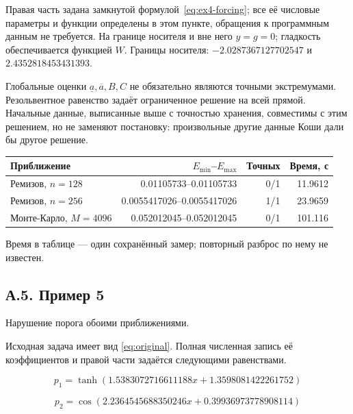 Правая часть задана замкнутой формулой~\eqref{eq:ex4-forcing}; все её числовые параметры и функции определены в этом пункте, обращения к программным данным не требуется. На границе носителя и вне него $y=g=0$; гладкость обеспечивается функцией $W$. Границы носителя: $-2.0287367127702547$ и $2.4352818453431393$.

Глобальные оценки $\underline a,\overline a,B,C$ не обязательно являются точными экстремумами. Резольвентное равенство задаёт ограниченное решение на всей прямой. Начальные данные, выписанные выше с точностью хранения, совместимы с этим решением, но не заменяют постановку: произвольные другие данные Коши дали бы другое решение.

\begin{center}\label{tab:ex4}\begin{tabular}{lrrr}\toprule Приближение&$E_{\min}$--$E_{\max}$&Точных&Время, с\\\midrule

Ремизов, $n=128$&0.01105733--0.01105733&0/1&11.9612\\

Ремизов, $n=256$&0.0055417026--0.0055417026&1/1&23.9659\\

Монте-Карло, $M=4096$&0.052012045--0.052012045&0/1&101.116\\

\bottomrule\end{tabular}\end{center}

Время в таблице --- один сохранённый замер; повторный разброс по нему не известен.

\clearpage

\subsection*{А.5. Пример 5}\label{app:ex5}

Нарушение порога обоими приближениями.

Исходная задача имеет вид \eqref{eq:original}. Полная численная запись её коэффициентов и правой части задаётся следующими равенствами.

\begin{equation}
p_{1}=\tanh{\left(1.5383072716611188 x + 1.3598081422261752 \right)}
\end{equation}


\begin{equation}
p_{2}=\cos{\left(2.2364545688350246 x + 0.39936973778908114 \right)}
\end{equation}


